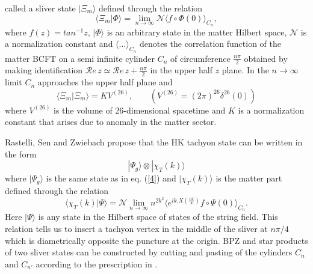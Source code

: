\documentclass[a4paper,12pt]{article}
\begin{document}
called a sliver state $|\Xi_m\rangle$ defined through the relation
\cite{rsz2,rsz3}
\begin{equation}
\langle\Xi_m|\Phi\rangle= \lim_{n\to\infty}
\mathcal{N}
\langle f\circ\Phi(0)\rangle_{C_n},
\label{v5}
\end{equation}
where $f(z)=tan^{-1}z$, $|\Phi\rangle$ is an arbitrary state in the matter
Hilbert space, $\mathcal{N}$ is a normalization constant and
$\langle\dots\rangle_{C_n}$ denotes the correlation function of the matter
BCFT on a semi infinite cylinder $C_n$ of circumference $\frac{n\pi}{2}$
obtained
by making identification ${\mathcal Re}\,z\simeq
{\mathcal Re}\,z+\frac{n\pi}{2}$
in the upper half $z$ plane. In the $n\to\infty$ limit $C_n$ approaches the
upper half plane and
\begin{equation}
\langle\Xi_m|\Xi_m\rangle=KV^{(26)}, \qquad (V^{(26)}=(2\pi)^{26}
\delta^{26}(0))
\label{7}
\end{equation}
where $V^{(26)}$ is the volume of 26-dimensional spacetime and $K$ is a
normalization constant that arises due to anomaly in the matter sector.

Rastelli, Sen and Zwiebach propose that the HK tachyon state can be written
in the form
$$
|\Psi_g\rangle\otimes|\chi_T(k)\rangle
$$
where $|\Psi_g\rangle$ is the same state as in eq. (\ref{4}) and
$|\chi_T(k)\rangle$ is the matter part defined through the
relation
\begin{equation}
\langle\chi_T(k)|\Psi\rangle=\mathcal{N}\lim_{n\to\infty} n^{2k^2}
\langle e^{ik.X(\frac{n\pi}{4})}f\circ\Psi(0)\rangle_{C_n} .
\label{def}
\end{equation}
Here  $|\Psi\rangle$ is any state in the Hilbert space of states of the
string field.
This relation tells us to insert a tachyon vertex in the middle of the
sliver at $n\pi/4$ which is diametrically opposite the puncture at the origin.
BPZ and star products of two sliver states can be constructed by cutting
and pasting of the cylinders $C_n$ and $C_{n'}$ according to the
prescription in \cite{rsz2,rsz5}.
\end{document}
